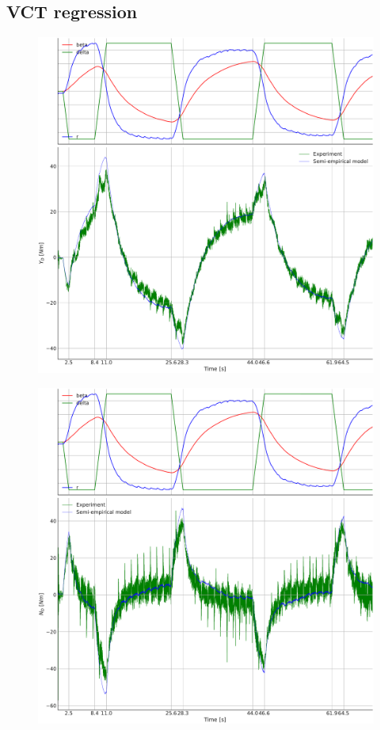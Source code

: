 \subsection{VCT regression}
\label{sec:result_VCT_regression}
\begin{figure}[!h]
    \includegraphics[width=\textwidth]{figures/result_VCT_regression.VCT_regression_ID_Y.pdf}
    \caption{}
    \label{fig:VCT_regression_ID_Y}
\end{figure}

\begin{figure}[!h]
    \includegraphics[width=\textwidth]{figures/result_VCT_regression.VCT_regression_ID_N.pdf}
    \caption{}
    \label{fig:VCT_regression_ID_N}
\end{figure}